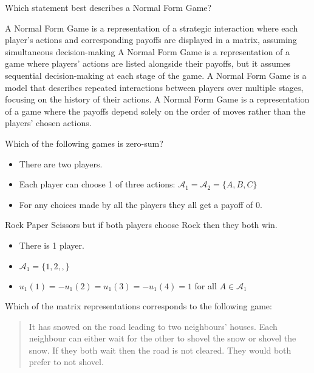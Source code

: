 \documentclass{exam}
\begin{document}
\begin{questions}
        
\question 
    Which statement best describes a Normal Form Game?
\begin{checkboxes}
   \choice 
A Normal Form Game is a representation of a strategic interaction where each
    player's actions and corresponding payoffs are displayed in a matrix, assuming simultaneous decision-making
   \choice 
A Normal Form Game is a representation of a game where players' actions are listed alongside their payoffs, but it assumes sequential decision-making at each stage of the game.
   \choice 
A Normal Form Game is a model that describes repeated interactions between players over multiple stages, focusing on the history of their actions.
    \choice
A Normal Form Game is a representation of a game where the payoffs depend solely
    on the order of moves rather than the players' chosen actions.
\end{checkboxes}



\question Which of the following games is zero-sum?
\begin{checkboxes}
   \choice 
        \begin{itemize}
            \item There are two players.
            \item Each player can choose 1 of three actions:
                $\mathcal{A}_1=\mathcal{A}_2=\{A, B, C\}$
            \item For any choices made by all the players they all get a payoff
                of 0.
        \end{itemize}
   \choice 
        Rock Paper Scissors but if both players choose Rock then they both win.
   \choice 
        \begin{itemize} 
            \item There is 1 player.
            \item \(\mathcal{A}_1=\{1, 2, ,\}\)
            \item \(u_1(1)=-u_1(2)=u_1(3)=-u_1(4)=1\) for all \(A \in \mathcal{A}_1\)
        \end{itemize}
\end{checkboxes}

\question Which of the matrix representations corresponds to the following game:

    \begin{quote}
        It has snowed on the road leading to two neighbours' houses. Each
        neighbour can either wait for the other to shovel the snow or shovel the
        snow. If they both wait then the road is not cleared. They would both
        prefer to not shovel.
    \end{quote}


\end{questions}
\end{document}

